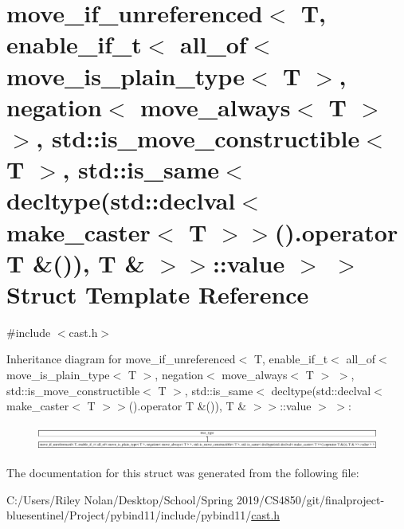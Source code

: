 \hypertarget{structmove__if__unreferenced_3_01_t_00_01enable__if__t_3_01all__of_3_01move__is__plain__type_3_0e0037512a8219bd3a92e5f367a13fd7c}{}\section{move\+\_\+if\+\_\+unreferenced$<$ T, enable\+\_\+if\+\_\+t$<$ all\+\_\+of$<$ move\+\_\+is\+\_\+plain\+\_\+type$<$ T $>$, negation$<$ move\+\_\+always$<$ T $>$ $>$, std\+::is\+\_\+move\+\_\+constructible$<$ T $>$, std\+::is\+\_\+same$<$ decltype(std\+::declval$<$ make\+\_\+caster$<$ T $>$$>$().operator T \&()), T \& $>$$>$\+::value $>$ $>$ Struct Template Reference}
\label{structmove__if__unreferenced_3_01_t_00_01enable__if__t_3_01all__of_3_01move__is__plain__type_3_0e0037512a8219bd3a92e5f367a13fd7c}


{\ttfamily \#include $<$cast.\+h$>$}

Inheritance diagram for move\+\_\+if\+\_\+unreferenced$<$ T, enable\+\_\+if\+\_\+t$<$ all\+\_\+of$<$ move\+\_\+is\+\_\+plain\+\_\+type$<$ T $>$, negation$<$ move\+\_\+always$<$ T $>$ $>$, std\+::is\+\_\+move\+\_\+constructible$<$ T $>$, std\+::is\+\_\+same$<$ decltype(std\+::declval$<$ make\+\_\+caster$<$ T $>$$>$().operator T \&()), T \& $>$$>$\+::value $>$ $>$\+:\begin{figure}[H]
\begin{center}
\leavevmode
\includegraphics[height=0.834575cm]{structmove__if__unreferenced_3_01_t_00_01enable__if__t_3_01all__of_3_01move__is__plain__type_3_0e0037512a8219bd3a92e5f367a13fd7c}
\end{center}
\end{figure}


The documentation for this struct was generated from the following file\+:\begin{DoxyCompactItemize}
\item 
C\+:/\+Users/\+Riley Nolan/\+Desktop/\+School/\+Spring 2019/\+C\+S4850/git/finalproject-\/bluesentinel/\+Project/pybind11/include/pybind11/\mbox{\hyperlink{cast_8h}{cast.\+h}}\end{DoxyCompactItemize}
